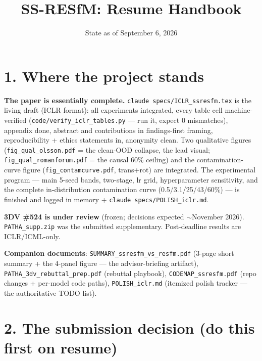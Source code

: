 \documentclass[11pt]{article}
\title{SS-RESfM: Resume Handbook}
\author{State as of September 6, 2026}
\date{}
\newcommand{\code}[1]{\texttt{\small #1}}
\begin{document}
\maketitle
\vspace{-2.5em}

\section*{1. Where the project stands}

\textbf{The paper is essentially complete.} \code{claude specs/ICLR\_ssresfm.tex} is the living
draft (ICLR format): all experiments integrated, every table cell machine-verified
(\code{code/verify\_iclr\_tables.py} — run it, expect 0 mismatches), appendix done, abstract and
contributions in findings-first framing, reproducibility + ethics statements in, anonymity
clean. Two qualitative figures (\code{fig\_qual\_olsson.pdf} = the clean-OOD collapse, the lead
visual; \code{fig\_qual\_romanforum.pdf} = the causal 60\% ceiling) and the contamination-curve
figure (\code{fig\_contamcurve.pdf}, trans+rot) are integrated. The experimental program —
main 5-seed bands, two-stage, lr grid, hyperparameter sensitivity, and the complete
in-distribution contamination curve (0.5/3.1/25/43/60\%) — is finished and logged in
memory + \code{claude specs/POLISH\_iclr.md}.

\textbf{3DV \#524 is under review} (frozen; decisions expected $\sim$November 2026).
\code{PATHA\_supp.zip} was the submitted supplementary. Post-deadline results are ICLR/ICML-only.

\textbf{Companion documents}: \code{SUMMARY\_ssresfm\_vs\_resfm.pdf} (3-page short summary + the
4-panel figure — the advisor-briefing artifact), \code{PATHA\_3dv\_rebuttal\_prep.pdf} (rebuttal
playbook), \code{CODEMAP\_ssresfm.pdf} (repo changes + per-model code paths),
\code{POLISH\_iclr.md} (itemized polish tracker — the authoritative TODO list).

\section*{2. The submission decision (do this first on resume)}
\end{document}
